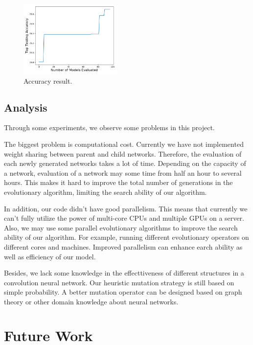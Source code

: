 \documentclass[conference]{IEEEtran}
\begin{document}
\begin{figure}[H]
	\centering
	\includegraphics[width=0.45\textwidth]{figures/result_curve.png}
	\caption{Accuracy result.}\label{fig:digit}
	\label{curve}
\end{figure}

\subsection{Analysis}
  Through some experiments, we observe some problems in this project.

  The biggest problem is computational cost. Currently we have not implemented weight sharing between parent and child networks. Therefore, the evaluation of each newly generated networks takes a lot of time. Depending on the capacity of a network, evaluation of a network may some time from half an hour to several hours. This makes it hard to improve the total number of generations in the evolutionary algorithm, limiting the  search ability of our algorithm.

  In addition, our code didn't have good parallelism. This means that currently we can't fully utilize the power of multi-core CPUs and multiple GPUs on a server. Also, we may use some parallel evolutionary algorithms to improve the search ability of our algorithm. For example, running different evolutionary operators on different cores and machines. Improved parallelism can enhance earch ability as well as efficiency of our model.
  
  Besides, we lack some knowledge in the effecttiveness of different structures in a convolution neural network. Our heuristic mutation strategy is still based on simple probability. A better mutation operator can be designed based on graph theory or other domain knowledge about neural networks.



 \section{Future Work}  
\end{document}
